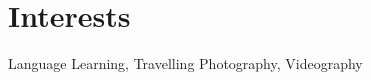 \section{Interests}

\begin{itemize}
    \cvdoubleitem
        {Language Learning, Travelling}
        {}
    \cvdoubleitem
        {Photography, Videography}
        {}
\end{itemize}
